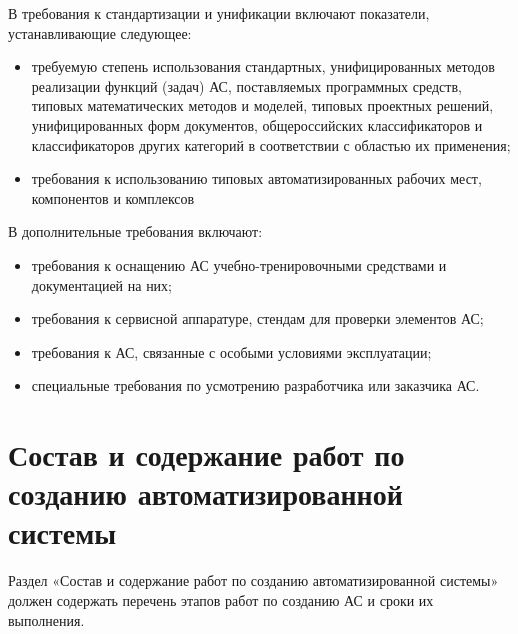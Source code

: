 {В требования к стандартизации и унификации включают показатели, устанавливающие следующее:
\begin{itemize}
  \item требуемую степень использования стандартных, унифицированных методов реализации функций (задач) АС, поставляемых программных средств, типовых математических методов и моделей, типовых проектных решений, унифицированных форм документов, общероссийских классификаторов и классификаторов других категорий в соответствии с областью их применения;
  \item требования к использованию типовых автоматизированных рабочих мест, компонентов и комплексов
\end{itemize}
В дополнительные требования включают:
\begin{itemize}
  \item требования к оснащению АС учебно-тренировочными средствами и документацией на них;
  \item требования к сервисной аппаратуре, стендам для проверки элементов АС;
  \item требования к АС, связанные с особыми условиями эксплуатации;
  \item специальные требования по усмотрению разработчика или заказчика АС.
\end{itemize}
\section{Состав и содержание работ по созданию автоматизированной системы}
Раздел «Состав и содержание работ по созданию автоматизированной системы» должен содержать перечень этапов работ по созданию АС и сроки их выполнения.

}
